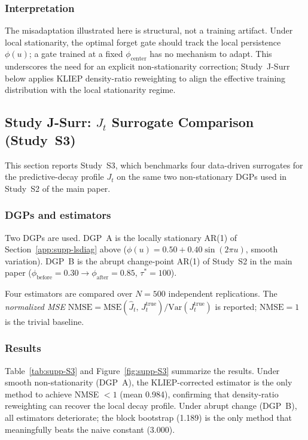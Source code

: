 \documentclass[bj,authoryear]{imsart}
\theoremstyle{plain}
\theoremstyle{definition}
\begin{document}
\subsubsection*{Interpretation}

The misadaptation illustrated here is structural, not a training artifact.
Under local stationarity, the optimal forget gate should track the local
persistence $\phi(u)$; a gate trained at a fixed $\phi_{\mathrm{center}}$
has no mechanism to adapt.
This underscores the need for an explicit non-stationarity correction;
Study~J-Surr below applies KLIEP density-ratio reweighting
\citep{sugiyama2012density} to align the effective training
distribution with the local stationarity regime.

\subsection{Study J-Surr: $J_t$ Surrogate Comparison (Study~S3)}
\label{app:supp-jsurr}

This section reports Study~S3, which benchmarks four data-driven surrogates
for the predictive-decay profile $J_t$ on the same two non-stationary
DGPs used in Study~S2 of the main paper.

\subsubsection*{DGPs and estimators}

Two DGPs are used.
DGP~A is the locally stationary AR(1) of Section~\ref{app:supp-lsdiag} above
($\phi(u) = 0.50 + 0.40\sin(2\pi u)$, smooth variation).
DGP~B is the abrupt change-point AR(1) of Study~S2 in the main paper
($\phi_{\mathrm{before}} = 0.30 \to \phi_{\mathrm{after}} = 0.85$, $\tau^* = 100$).

Four estimators are compared over $N = 500$ independent replications.
The \emph{normalized MSE}
$\mathrm{NMSE} = \mathrm{MSE}(\hat J_t,\,J_t^{\mathrm{true}}) / \mathrm{Var}(J_t^{\mathrm{true}})$
is reported; $\mathrm{NMSE} = 1$ is the trivial baseline.

\subsubsection*{Results}

Table~\ref{tab:supp-S3} and Figure~\ref{fig:supp-S3} summarize the results.
Under smooth non-stationarity (DGP~A), the KLIEP-corrected estimator is the
only method to achieve NMSE $< 1$ (mean 0.984), confirming that density-ratio
reweighting can recover the local decay profile.
Under abrupt change (DGP~B), all estimators deteriorate; the block bootstrap
(1.189) is the only method that meaningfully beats the naive constant (3.000).
\end{document}
